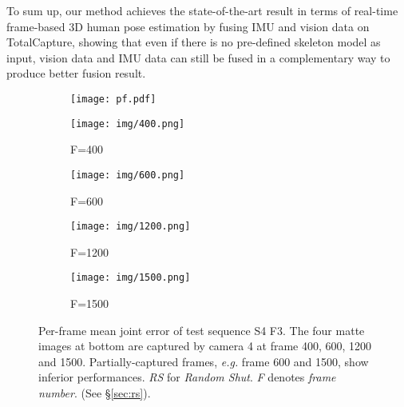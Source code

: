 \documentclass[10pt,twocolumn,letterpaper]{article}
\begin{document}
To sum up, our method achieves the state-of-the-art result in terms of real-time frame-based 3D human pose estimation by fusing IMU and vision data on TotalCapture, showing that even if there is no pre-defined skeleton model as input, vision data and IMU data can still be fused in a complementary way to produce better fusion result.  


\begin{figure}
\begin{center}
\centering
    \begin{subfigure}[b]{\linewidth}
    \centering
        \texttt{[image: pf.pdf]}
    \end{subfigure}
    \begin{subfigure}[b]{0.1\textwidth}
    \centering
        \texttt{[image: img/400.png]}
        \captionsetup{labelformat=empty}
        \caption{F=400}
    \end{subfigure}
     \begin{subfigure}[b]{0.1\textwidth}
    \centering
        \texttt{[image: img/600.png]}
        \captionsetup{labelformat=empty}
        \caption{F=600}
    \end{subfigure}
    \begin{subfigure}[b]{0.1\textwidth}
    \centering
        \texttt{[image: img/1200.png]}
        \captionsetup{labelformat=empty}
        \caption{F=1200}
    \end{subfigure}
    \begin{subfigure}[b]{0.1\textwidth}
    \centering
        \texttt{[image: img/1500.png]}
        \captionsetup{labelformat=empty}
        \caption{F=1500}
    \end{subfigure}
\end{center}
    \vspace{-0.5cm}
   \caption{Per-frame mean joint error of test sequence S4 F3. The four matte images at bottom are captured by camera 4 at frame 400, 600, 1200 and 1500. Partially-captured frames, \textit{e.g.} frame 600 and 1500, show inferior performances. \textit{RS} for \textit{Random Shut}. \textit{F} denotes \textit{frame number}. (See \S\ref{sec:rs}).}
\label{fig:rs}
\vspace*{-14pt}
\end{figure}

\vspace*{-4pt}
\end{document}
